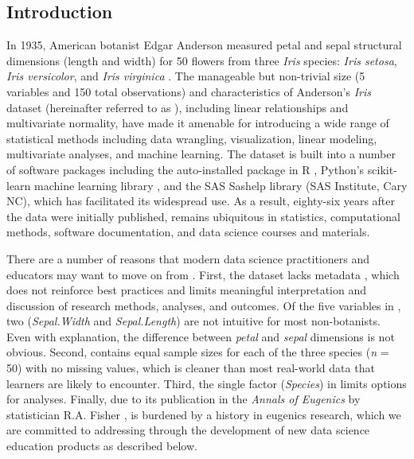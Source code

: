 \hypertarget{introduction}{%
\subsection{Introduction}\label{introduction}}

In 1935, American botanist Edgar Anderson measured petal and sepal
structural dimensions (length and width) for 50 flowers from three
\emph{Iris} species: \emph{Iris setosa}, \emph{Iris versicolor}, and
\emph{Iris virginica} \citep{anderson_irises_1935}. The manageable but
non-trivial size (5 variables and 150 total observations) and
characteristics of Anderson's \emph{Iris} dataset (hereinafter referred
to as ), including linear relationships and multivariate
normality, have made it amenable for introducing a wide range of
statistical methods including data wrangling, visualization, linear
modeling, multivariate analyses, and machine learning. The 
dataset is built into a number of software packages including the
auto-installed  package in R \citep{r_core_team_r_2019},
Python's scikit-learn machine learning library
\citep{pedregosa_scikit-learn_2011}, and the SAS Sashelp library (SAS
Institute, Cary NC), which has facilitated its widespread use. As a
result, eighty-six years after the data were initially published,
 remains ubiquitous in statistics, computational methods,
software documentation, and data science courses and materials.

There are a number of reasons that modern data science practitioners and
educators may want to move on from . First, the dataset lacks
metadata \citep{anderson_irises_1935}, which does not reinforce best
practices and limits meaningful interpretation and discussion of
research methods, analyses, and outcomes. Of the five variables in
, two (\emph{Sepal.Width} and \emph{Sepal.Length}) are not
intuitive for most non-botanists. Even with explanation, the difference
between \emph{petal} and \emph{sepal} dimensions is not obvious. Second,
 contains equal sample sizes for each of the three species
(\emph{n} = 50) with no missing values, which is cleaner than most
real-world data that learners are likely to encounter. Third, the single
factor (\emph{Species}) in  limits options for analyses.
Finally, due to its publication in the \emph{Annals of Eugenics} by
statistician R.A. Fisher \citep{fisher_use_1936},  is
burdened by a history in eugenics research, which we are committed to
addressing through the development of new data science education
products as described below.

